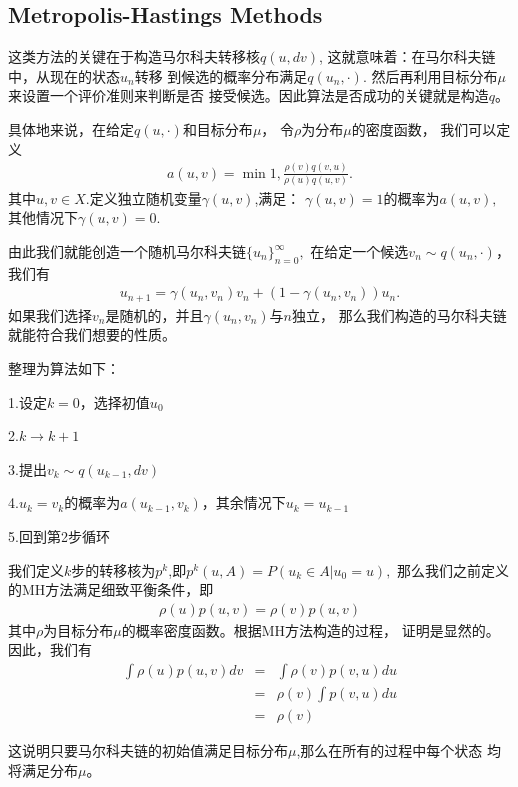 \documentclass[a4paper,12pt,oneside,CJK]{cctbook}
\theoremstyle{definition}
\numberwithin{equation}{section}
\begin{document}
\subsection{Metropolis-Hastings Methods}

这类方法的关键在于构造马尔科夫转移核$q(u,dv)$,
这就意味着：在马尔科夫链中，从现在的状态$u_n$转移
到候选的概率分布满足$q(u_n,\cdot).$ 然后再利用目标分布$\mu$来设置一个评价准则来判断是否
接受候选。因此算法是否成功的关键就是构造$q$。

具体地来说，在给定$q(u,\cdot)$和目标分布$\mu$，
令$\rho$为分布$\mu$的密度函数，
我们可以定义
\begin{eqnarray*}
   a(u,v)=\min{1,\frac{\rho(v)q(v,u)}{\rho(u)q(u,v)}}.
\end{eqnarray*}
其中$u,v\in X$.定义独立随机变量$\gamma(u,v)$,满足：
$\gamma(u,v)=1$的概率为$a(u,v),$其他情况下$\gamma(u,v)=0.$

由此我们就能创造一个随机马尔科夫链$\{u_n\}_{n=0}^{\infty},$
在给定一个候选$v_n\sim q(u_n,\cdot)$，我们有
\begin{eqnarray}
   u_{n+1}=\gamma(u_n,v_n)v_n+(1-\gamma(u_n,v_n))u_n.
\end{eqnarray}
如果我们选择$v_n$是随机的，并且$\gamma(u_n,v_n)$与$n$独立，
那么我们构造的马尔科夫链就能符合我们想要的性质。

整理为算法如下：

1.设定$k=0$，选择初值$u_0$

2.$k\rightarrow k+1$

3.提出$v_k\sim q(u_{k-1},dv)$

4.$u_k=v_k$的概率为$a(u_{k-1},v_k)$，其余情况下$u_k=u_{k-1}$

5.回到第2步循环

我们定义$k$步的转移核为$p^k$,即$p^k(u,A)=P(u_k\in A|u_0=u),$
那么我们之前定义的MH方法满足细致平衡条件，即
\begin{eqnarray}
    \rho(u)p(u,v)=\rho(v)p(u,v)
\end{eqnarray}
其中$\rho$为目标分布$\mu$的概率密度函数。根据MH方法构造的过程，
证明是显然的。因此，我们有
\begin{eqnarray}
   \int \rho(u)p(u,v)dv&=&\int \rho(v)p(v,u)du\\
                       &=&\rho(v)\int p(v,u)du\\
                       &=&\rho(v)
\end{eqnarray}

这说明只要马尔科夫链的初始值满足目标分布$\mu$,那么在所有的过程中每个状态
均将满足分布$\mu$。
\end{document}
